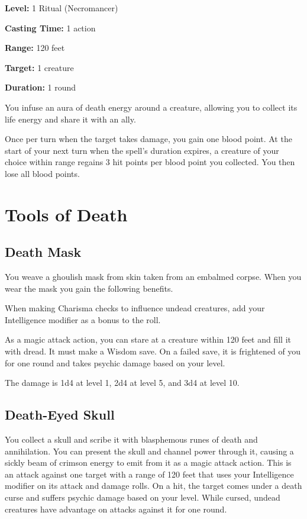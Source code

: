 \documentclass[12pt,letterpaper,twocolumn,openany,nodeprecatedcode,bg=none]{dndbook}
\let\oldsubsection\subsection
\renewcommand{\subsection}[1]{%
  \needspace{5\baselineskip}%
  \oldsubsection{#1}%
}
\begin{document}
\textbf{Level:} 1 Ritual (Necromancer)

\textbf{Casting Time:} 1 action

\textbf{Range:} 120 feet

\textbf{Target:} 1 creature

\textbf{Duration:} 1 round

You infuse an aura of death energy around a creature, allowing you to
collect its life energy and share it with an ally.

Once per turn when the target takes damage, you gain one blood point. At
the start of your next turn when the spell's duration expires, a
creature of your choice within range regains 3 hit points per blood
point you collected. You then lose all blood points.

\newpage

\section{Tools of Death}\label{tools-of-death}

\subsection{Death Mask}\label{death-mask}

You weave a ghoulish mask from skin taken from an embalmed corpse. When
you wear the mask you gain the following benefits.

When making Charisma checks to influence undead creatures, add your
Intelligence modifier as a bonus to the roll.

As a magic attack action, you can stare at a creature within 120 feet
and fill it with dread. It must make a Wisdom save. On a failed save, it
is frightened of you for one round and takes psychic damage based on
your level.

The damage is 1d4 at level 1, 2d4 at level 5, and 3d4 at level 10.

\subsection{Death-Eyed Skull}\label{death-eyed-skull}

You collect a skull and scribe it with blasphemous runes of death and
annihilation. You can present the skull and channel power through it,
causing a sickly beam of crimson energy to emit from it as a magic
attack action. This is an attack against one target with a range of 120
feet that uses your Intelligence modifier on its attack and damage
rolls. On a hit, the target comes under a death curse and suffers
psychic damage based on your level. While cursed, undead creatures have
advantage on attacks against it for one round.
\end{document}

